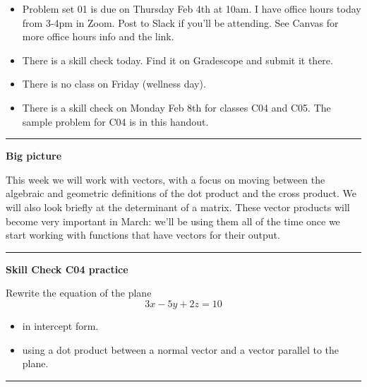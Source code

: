 \documentclass[12pt,letterpaper,noanswers]{exam}
\begin{document}
 \pdfpageheight 11in 
  \pdfpagewidth 8.5in



\begin{itemize}
\itemsep0em
    \item Problem set 01 is due on Thursday Feb 4th at 10am.  I have office hours today from 3-4pm in Zoom.  Post to Slack if you'll be attending.  See Canvas for more office hours info and the link.
    \item There is a skill check today.  Find it on Gradescope and submit it there.
    \item There is no class on Friday (wellness day).
    \item There is a skill check on Monday Feb 8th for classes C04 and C05.  The sample problem for C04 is in this handout.
\end{itemize}

\hrule
\vspace{0.2cm}



\noindent\textbf{Big picture}

This week we will work with vectors, with a focus on moving between the algebraic and geometric definitions of the dot product and the cross product.  We will also look briefly at the determinant of a matrix.  These vector products will become very important in March: we'll be using them all of the time once we start working with functions that have vectors for their output.

\vspace{0.2cm}
\hrule
\vspace{0.2cm}

\noindent\textbf{Skill Check C04 practice}

Rewrite the equation of the plane
\[3x -5y +2z = 10 \]
\begin{itemize}
\itemsep0em
    \item in intercept form.
    \item using a dot product between a normal vector and a vector parallel to the plane.
\end{itemize}

\vspace{0.2cm}

\hrule
\vspace{0.2cm}
\end{document}
